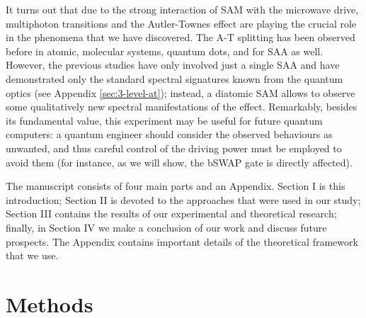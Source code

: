 \documentclass[%
 aip,
 amsmath,amssymb,
 reprint,%
]{revtex4-1}
\begin{document}
It turns out that due to the strong interaction of SAM with the microwave drive, multiphoton transitions and the Autler-Townes effect are playing the crucial role in the phenomena that we have discovered. The A-T splitting has been observed before in atomic\cite{picque1976direct}, molecular systems\cite{tamarat1995pump}, quantum dots\cite{xu2007coherent}, and for SAA as well\cite{baur2009measurement, sillanpaa2009autler, novikov2013autler, suri2013observation, peng2018vacuum}. However, the previous studies have  only involved just a single SAA and have demonstrated only the standard spectral signatures known from the quantum optics (see Appendix \ref{sec:3-level-at}); instead, a diatomic SAM allows to observe some qualitatively new spectral manifestations of the effect. Remarkably, besides its fundamental value, this experiment may be useful for future quantum computers: a quantum engineer should consider the observed behaviours as unwanted, and thus careful control of the driving power must be employed to avoid them (for instance, as we will show, the bSWAP gate\cite{poletto2012entanglement} is directly affected).

The manuscript consists of four main parts and an Appendix. Section I is this introduction; Section II is devoted to the approaches that were used in our study; Section III contains the results of our experimental and theoretical research; finally, in Section IV we make a conclusion of our work and discuss future prospects. The Appendix contains important details of the theoretical framework that we use.

\section{Methods}
\end{document}
